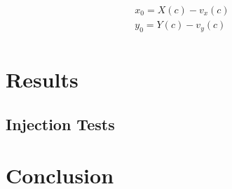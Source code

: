 \documentclass[12pt,preprint]{emulateapj}
\begin{document}
\[
\begin{aligned}
x_0 = X(c) - v_x(c) \\
y_0 = Y(c) - v_y(c) \\
\end{aligned}
\]

\section{Results}

\subsection{Injection Tests}

\section{Conclusion}

\clearpage


\end{document}
